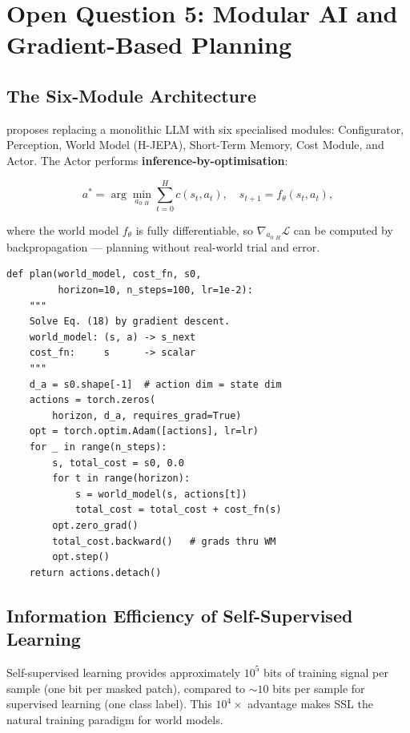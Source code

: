 \documentclass[10pt,twocolumn]{article}
\begin{document}
\section{Open Question 5: Modular AI and Gradient-Based Planning}
\label{sec:modular}

\subsection{The Six-Module Architecture}

\citet{lecun2022path} proposes replacing a monolithic LLM with six
specialised modules: Configurator, Perception, World Model (H-JEPA),
Short-Term Memory, Cost Module, and Actor.  The Actor performs
\textbf{inference-by-optimisation}:

\begin{equation}
  a^* = \arg\min_{a_{0:H}} \sum_{t=0}^{H} c(s_t, a_t),
  \quad s_{t+1} = f_\theta(s_t, a_t),
  \label{eq:planning}
\end{equation}

\noindent where the world model $f_\theta$ is fully differentiable,
so $\nabla_{a_{0:H}} \mathcal{L}$ can be computed by backpropagation —
planning without real-world trial and error.

\begin{lstlisting}[caption={Gradient-based planning through a world model.}]
def plan(world_model, cost_fn, s0,
         horizon=10, n_steps=100, lr=1e-2):
    """
    Solve Eq. (18) by gradient descent.
    world_model: (s, a) -> s_next
    cost_fn:     s      -> scalar
    """
    d_a = s0.shape[-1]  # action dim = state dim
    actions = torch.zeros(
        horizon, d_a, requires_grad=True)
    opt = torch.optim.Adam([actions], lr=lr)
    for _ in range(n_steps):
        s, total_cost = s0, 0.0
        for t in range(horizon):
            s = world_model(s, actions[t])
            total_cost = total_cost + cost_fn(s)
        opt.zero_grad()
        total_cost.backward()   # grads thru WM
        opt.step()
    return actions.detach()
\end{lstlisting}

\subsection{Information Efficiency of Self-Supervised Learning}

Self-supervised learning provides approximately $10^5$ bits of training
signal per sample (one bit per masked patch), compared to $\sim 10$ bits
per sample for supervised learning (one class label).  This
$10^4\times$ advantage makes SSL the natural training paradigm for
world models.
\end{document}
